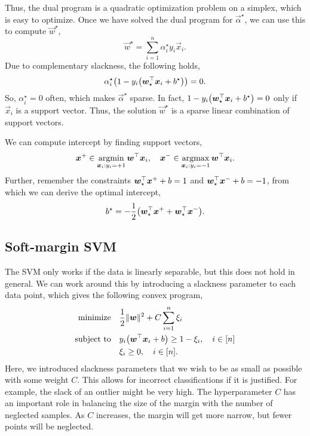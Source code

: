 Thus, the dual program is a quadratic optimization problem on a simplex, which is easy to optimize.
Once we have solved the dual program for $\vec{\alpha}^\star$, we can use this to compute $\vec{w}^\star$, \[
    \vec{w}^\star = \sum_{i=1}^{n} \alpha_i^\star y_i \vec{x}_i.
\]
Due to complementary slackness, the following holds, \[
    \alpha_i^\star \lft( 1 - y_i \lft( \transpose{\vec{w}_\star} \vec{x}_i + b^\star \rgt) \rgt) = 0.
\]
So, $\alpha_i^\star = 0$ often, which makes $\vec{\alpha}^\star$ sparse. In fact, $1 - y_i \lft(
    \transpose{\vec{w}_\star} \vec{x}_i + b^\star \rgt) = 0$ only if $\vec{x}_i$ is a support vector.
Thus, the solution $\vec{w}^\star$ is a sparse linear combination of support vectors.

We can compute intercept by finding support vectors, \[
    \bm{x}^+ \in \operatorname*{argmin}_{\bm{x}_i : y_i = +1} \bm{w}^\top \bm{x}_i, \quad \bm{x}^- \in \operatorname*{argmax}_{\bm{x}_i : y_i = -1} \bm{w}^\top \bm{x}_i.
\]
Further, remember the constraints $\bm{w}_\star^\top \bm{x}^+ + b = 1$ and
$\bm{w}_\star^\top \bm{x}^- + b = -1$, from which we can derive the optimal intercept, \[
    b^\star = -\frac{1}{2} \lft( \transpose{\vec{w}_\star} \vec{x}^+ + \transpose{\vec{w}_\star} \vec{x}^- \rgt).
\]

\subsection{Soft-margin SVM}

The SVM only works if the data is linearly separable, but this does not hold in general. We can
work around this by introducing a slackness parameter to each data point, which gives the following
convex program,
\begin{align*}
    \text{minimize}   & \quad \frac{1}{2} \| \vec{w} \|^2 + C \sum_{i=1}^{n} \xi_i                              \\
    \text{subject to} & \quad y_i \lft( \transpose{\vec{w}} \vec{x}_i + b \rgt) \geq 1 - \xi_i, \quad i \in [n] \\
                      & \quad \xi_i \geq 0, \quad i \in [n].
\end{align*}
Here, we introduced slackness parameters that we wish to be as small as possible with some weight $C$.
This allows for incorrect classifications if it is justified. For example, the slack of an outlier
might be very high. The hyperparameter $C$ has an important role in balancing the size of the margin
with the number of neglected samples. As $C$ increases, the margin will get more narrow, but fewer points
will be neglected.

